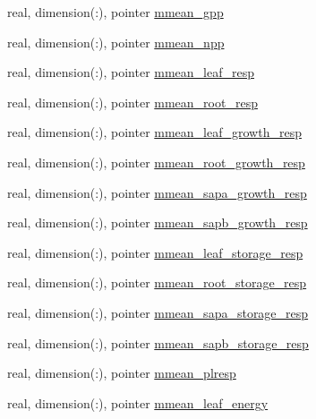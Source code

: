 \begin{DoxyCompactItemize}
real, dimension(\+:), pointer \hyperlink{structed__state__vars_1_1patchtype_a4c4ce2666bd87005e1ee2c816b521af2}{mmean\+\_\+gpp}
\item 
real, dimension(\+:), pointer \hyperlink{structed__state__vars_1_1patchtype_a2375cee1381f9878ac9d98e187b61cde}{mmean\+\_\+npp}
\item 
real, dimension(\+:), pointer \hyperlink{structed__state__vars_1_1patchtype_a0c4dd8bc1dc586f1ecffeed6f4b9760b}{mmean\+\_\+leaf\+\_\+resp}
\item 
real, dimension(\+:), pointer \hyperlink{structed__state__vars_1_1patchtype_a26dcf405871e2aa5dbd79f335a51cc56}{mmean\+\_\+root\+\_\+resp}
\item 
real, dimension(\+:), pointer \hyperlink{structed__state__vars_1_1patchtype_a55caa88c318117a545a331ca6a1ad03a}{mmean\+\_\+leaf\+\_\+growth\+\_\+resp}
\item 
real, dimension(\+:), pointer \hyperlink{structed__state__vars_1_1patchtype_ae0da3861264880ac612362df2501d864}{mmean\+\_\+root\+\_\+growth\+\_\+resp}
\item 
real, dimension(\+:), pointer \hyperlink{structed__state__vars_1_1patchtype_ac0dbd1dc2695c6848b40461809e253cd}{mmean\+\_\+sapa\+\_\+growth\+\_\+resp}
\item 
real, dimension(\+:), pointer \hyperlink{structed__state__vars_1_1patchtype_a473c971cb9fe334ba40f33f5fa79982d}{mmean\+\_\+sapb\+\_\+growth\+\_\+resp}
\item 
real, dimension(\+:), pointer \hyperlink{structed__state__vars_1_1patchtype_a1c3b5f1514c877daf75bbe8d75821189}{mmean\+\_\+leaf\+\_\+storage\+\_\+resp}
\item 
real, dimension(\+:), pointer \hyperlink{structed__state__vars_1_1patchtype_af3dbc08dbd7bda5b108c69f01b2ea8ab}{mmean\+\_\+root\+\_\+storage\+\_\+resp}
\item 
real, dimension(\+:), pointer \hyperlink{structed__state__vars_1_1patchtype_a07930fef33a41b53c74377e771da621d}{mmean\+\_\+sapa\+\_\+storage\+\_\+resp}
\item 
real, dimension(\+:), pointer \hyperlink{structed__state__vars_1_1patchtype_ab0454dce7fa61a466ef9a3a6ce746660}{mmean\+\_\+sapb\+\_\+storage\+\_\+resp}
\item 
real, dimension(\+:), pointer \hyperlink{structed__state__vars_1_1patchtype_a895b439293d625229718a4dbbb546619}{mmean\+\_\+plresp}
\item 
real, dimension(\+:), pointer \hyperlink{structed__state__vars_1_1patchtype_afff942a7d19b8e11f92d2fed3704c8c3}{mmean\+\_\+leaf\+\_\+energy}

\end{DoxyCompactItemize}

